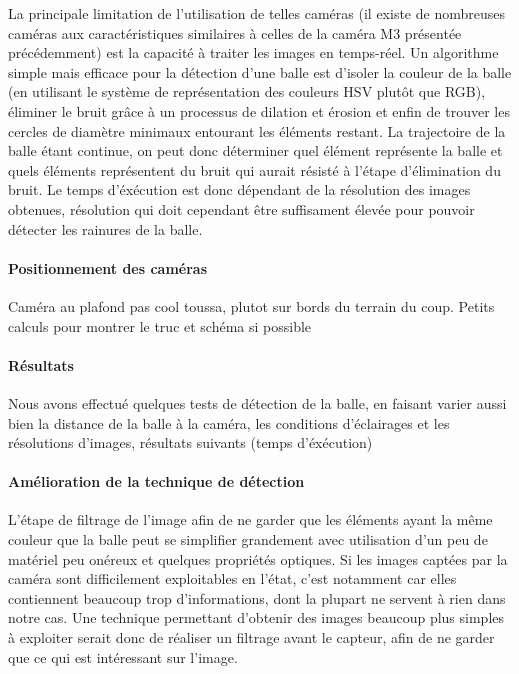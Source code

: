 La principale limitation de l'utilisation de telles caméras (il existe de nombreuses caméras aux caractéristiques similaires à celles de la caméra M3 présentée précédemment) est la capacité à traiter les images en temps-réel. Un algorithme simple mais efficace pour la détection d'une balle est d'isoler la couleur de la balle (en utilisant le système de représentation des couleurs HSV plutôt que RGB), éliminer le bruit grâce à un processus de dilation et érosion et enfin de trouver les cercles de diamètre minimaux entourant les éléments restant. La trajectoire de la balle étant continue, on peut donc déterminer quel élément représente la balle et quels éléments représentent du bruit qui aurait résisté à l'étape d'élimination du bruit. Le temps d'éxécution est donc dépendant de la résolution des images obtenues, résolution qui doit cependant être suffisament élevée pour pouvoir détecter les rainures de la balle. 


\paragraph{Positionnement des caméras\\}

Caméra au plafond pas cool toussa, plutot sur bords du terrain du coup. Petits calculs pour montrer le truc et schéma si possible


\paragraph{Résultats\\}

Nous avons effectué quelques tests de détection de la balle, en faisant varier aussi bien la distance de la balle à la caméra, les conditions d'éclairages et les résolutions d'images, résultats suivants (temps d'éxécution)


\paragraph{Amélioration de la technique de détection\\}

L'étape de filtrage de l'image afin de ne garder que les éléments ayant la même couleur que la balle peut se simplifier grandement avec utilisation d'un peu de matériel peu onéreux et quelques propriétés optiques. Si les images captées par la caméra sont difficilement exploitables en l'état, c'est notamment car elles contiennent beaucoup trop d'informations, dont la plupart ne servent à rien dans notre cas. Une technique permettant d'obtenir des images beaucoup plus simples à exploiter serait donc de réaliser un filtrage avant le capteur, afin de ne garder que ce qui est intéressant sur l'image. \\

